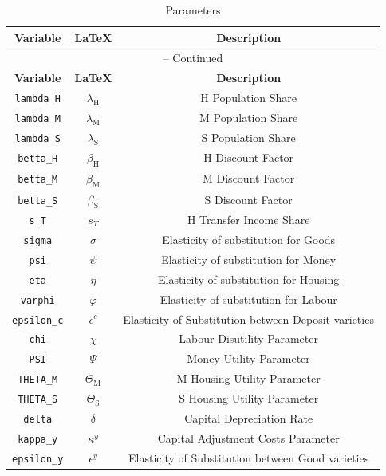 \begin{center}
\begin{longtable}{ccc}
\caption{Parameters}\\%
\hline%
\multicolumn{1}{c}{\textbf{Variable}} &
\multicolumn{1}{c}{\textbf{\LaTeX}} &
\multicolumn{1}{c}{\textbf{Description}}\\%
\hline\hline%
\endfirsthead
\multicolumn{3}{c}{{\tablename} \thetable{} -- Continued}\\%
\hline%
\multicolumn{1}{c}{\textbf{Variable}} &
\multicolumn{1}{c}{\textbf{\LaTeX}} &
\multicolumn{1}{c}{\textbf{Description}}\\%
\hline\hline%
\endhead
\texttt{lambda\_H} & $\lambda_\mathrm{H}$ & H Population Share\\
\texttt{lambda\_M} & $\lambda_\mathrm{M}$ & M Population Share\\
\texttt{lambda\_S} & $\lambda_\mathrm{S}$ & S Population Share\\
\texttt{betta\_H} & $\beta_\mathrm{H}$ & H Discount Factor\\
\texttt{betta\_M} & $\beta_\mathrm{M}$ & M Discount Factor\\
\texttt{betta\_S} & $\beta_\mathrm{S}$ & S Discount Factor\\
\texttt{s\_T} & $s_T$ & H Transfer Income Share\\
\texttt{sigma} & $\sigma$ & Elasticity of substitution for Goods\\
\texttt{psi} & $\psi$ & Elasticity of substitution for Money\\
\texttt{eta} & $\eta$ & Elasticity of substitution for Housing\\
\texttt{varphi} & $\varphi$ & Elasticity of substitution for Labour\\
\texttt{epsilon\_c} & $\epsilon^c$ & Elasticity of Substitution between Deposit varieties\\
\texttt{chi} & $\chi$ & Labour Disutility Parameter\\
\texttt{PSI} & $\Psi$ & Money Utility Parameter\\
\texttt{THETA\_M} & $\Theta_\mathrm{M}$ & M Housing Utility Parameter\\
\texttt{THETA\_S} & $\Theta_\mathrm{S}$ & S Housing Utility Parameter\\
\texttt{delta} & $\delta$ & Capital Depreciation Rate\\
\texttt{kappa\_y} & $\kappa^y$ & Capital Adjustment Costs Parameter\\
\texttt{epsilon\_y} & $\epsilon^y$ & Elasticity of Substitution between Good varieties\\

\end{longtable}
\end{center}
